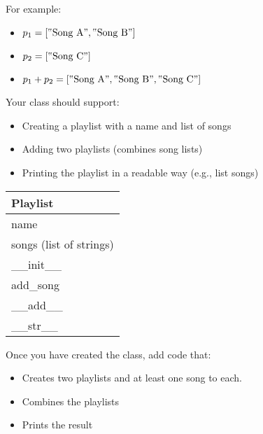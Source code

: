\documentclass{article}
\newcommand{\csqt}[1]{\text{\reflectbox{''}#1''}}  %
\begin{document}
\begin{enumerate}
		\begin{minipage}[t]{0.65\textwidth}
			For example:
			\begin{itemize}
				\item $p_1 = [\csqt{Song A}, \csqt{Song B}]$
				\item $p_2 = [\csqt{Song C}]$
				\item $p_1 + p_2 = [\csqt{Song A}, \csqt{Song B}, \csqt{Song C}]$
			\end{itemize}

			Your class should support:
			\begin{itemize}
				\item Creating a playlist with a name and list of songs
				\item Adding two playlists (combines song lists)
				\item Printing the playlist in a readable way (e.g., list songs)
			\end{itemize}	
		\end{minipage}
		\hfill
		\begin{minipage}[t]{0.32\textwidth}
			\vspace{.2em}
			\begin{flushright}
				\begin{tabular}{|l|}
					\hline
					Playlist \\ \hline
					name \\
					songs (list of strings) \\ \hline
					\_\_init\_\_ \\
					add\_song \\
					\_\_add\_\_ \\
					\_\_str\_\_ \\ \hline
				\end{tabular}
			\end{flushright}
		\end{minipage}
		
		Once you have created the class, add code that:
		\begin{itemize}
			\item Creates two playlists and at least one song to each.
			\item Combines the playlists
			\item Prints the result
		\end{itemize}




\end{enumerate}
\end{document}

